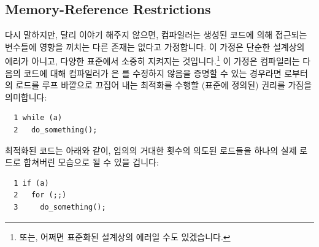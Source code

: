 \subsection{Memory-Reference Restrictions}
\label{sec:memorder:Memory-Reference Restrictions}

다시 말하지만, 달리 이야기 해주지 않으면, 컴파일러는 생성된 코드에 의해
접근되는 변수들에 영향을 끼치는 다른 존재는 없다고 가정합니다.
이 가정은 단순한 설계상의 에러가 아니고, 다양한 표준에서 소중히 지켜지는
것입니다.\footnote{
	또는, 어쩌면 표준화된 설계상의 에러일 수도 있겠습니다.}
이 가정은 컴파일러는 다음의 코드에 대해 컴파일러가  은
 를 수정하지 않음을 증명할 수 있는 경우라면  로부터의 로드를 루프
바깥으로 끄집어 내는 최적화를 수행할 (표준에 정의된) 권리를 가짐을 의미합니다:

\vspace{5pt}
\begin{minipage}[t]{\columnwidth}
\scriptsize
\begin{verbatim}
  1 while (a)
  2   do_something();
\end{verbatim}
\end{minipage}
\vspace{5pt}

최적화된 코드는 아래와 같이, 임의의 거대한 횟수의 의도된 로드들을 하나의 실제
로드로 합쳐버린 모습으로 될 수 있을 겁니다:

\vspace{5pt}
\begin{minipage}[t]{\columnwidth}
\scriptsize
\begin{verbatim}
  1 if (a)
  2   for (;;)
  3     do_something();
\end{verbatim}
\end{minipage}
\vspace{5pt}

